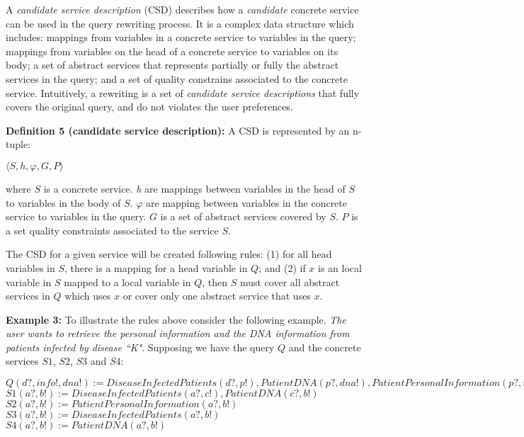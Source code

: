 
A \textit{candidate service description} (CSD) describes how a \textit{candidate} concrete service can be used in the query rewriting process.
It is a complex data structure which includes: mappings from variables in a concrete service to variables in the query; 
mappings from variables on the head of a concrete service to variables on its body;
a set of abstract services that represents partially or fully the abstract services in the query; and 
a set of quality constrains associated to the concrete service.
Intuitively, a rewriting is a set of \textit{candidate service descriptions} that fully covers the original query, and do not violates the user preferences.

\noindent \textbf{Definition 5 (candidate service description):} A CSD is represented by an n-tuple: %
\begin{center}
$\langle S, h, \varphi, G, P\rangle$
\end{center}
where $S$ is a concrete service. 
\textit{h} are mappings between variables in the head of $S$ to variables in the body of $S$. 
$\varphi$ are mapping between variables in the concrete service to variables in the query.
$G$ is a set of abstract services covered by $S$. 
$P$ is a set quality constraints associated to the service $S$. 

The CSD for a given service will be created following rules: (1) for all head variables in $S$, there is a mapping for a head variable in $Q$; and (2) if $x$ is an local variable in $S$ mapped to a local variable in $Q$, then $S$ must cover all abstract services in $Q$ which uses $x$ or cover only one abstract service that uses $x$.

\noindent \textbf{Example 3:} To illustrate the rules above consider the following example. 
\textit{The user wants to retrieve the personal information and the DNA information from patients infected by disease ``K"}.
Supposing we have the query $Q$ and the concrete services $S1$, $S2$, $S3$ and $S4$:

\begin{center}
$Q (d?, info!, dna!) := DiseaseInfectedPatients(d?, p!), PatientDNA(p?, dna!), PatientPersonalInformation(p?, info!)$ \\
$S1 (a?, b!) := DiseaseInfectedPatients(a?, c!), PatientDNA(c?, b!)$ \\
$S2 (a?, b!) := PatientPersonalInformation(a?, b!)$ \\
$S3 (a?, b!) := DiseaseInfectedPatients(a?, b!)$ \\
$S4 (a?, b!) := PatientDNA(a?, b!)$ \\
\end{center} 

